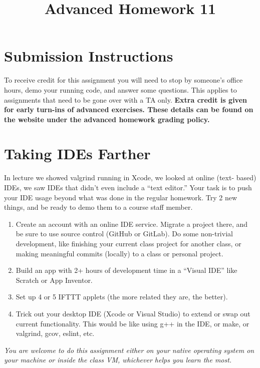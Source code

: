 \documentclass{article}
\begin{document}
\fancyfoot[C]{\color{gray} \thepage~/~\pageref*{LastPage}}
\pagestyle{fancyplain}

\title{\textbf{Advanced Homework 11\\}}
\author{\textbf{\color{red}{Due: Wednesday, November 28th, 11:59PM (Hard Deadline)}}}
\date{}
\maketitle


\section*{Submission Instructions}
To receive credit for this assignment you will need to stop by someone's
office hours, demo your running code, and answer some questions. \textbf{\color{red}{Make sure
to check the office hour schedule as the real due date is at the last office
hours before the date listed above.}} This applies to assignments that need to be gone over with a TA only.
\textbf{Extra credit is given for early turn-ins of advanced exercises. These details can be found on the website under the advanced homework grading policy.}


\section*{Taking IDEs Farther}
In lecture we showed valgrind running in Xcode, we looked at online (text-
based) IDEs, we saw IDEs that didn't even include a ``text editor.'' Your task
is to push your IDE usage beyond what was done in the regular homework. Try
2 new things, and be ready to demo them to a course staff member.

\begin{enumerate}
\item Create an account with an online IDE service. Migrate a project there,
      and be sure to use source control (GitHub or GitLab). Do some non-trivial
      development, like finishing your current class project for another class,
      or making meaningful commits (locally) to a class or personal project.
\item Build an app with 2+ hours of development time in a ``Visual IDE'' like
      Scratch or App Inventor.
\item Set up 4 or 5 IFTTT applets (the more related they are, the better).
\item Trick out your desktop IDE (Xcode or Visual Studio) to extend or swap out
      current functionality. This would be like using g++ in the IDE, or make,
      or valgrind, gcov, eslint, etc.
\end{enumerate}

\emph{You are welcome to do this assignment either on your native operating
  system on your machine or inside the class VM, whichever helps you learn the
  most.}
\end{document}
